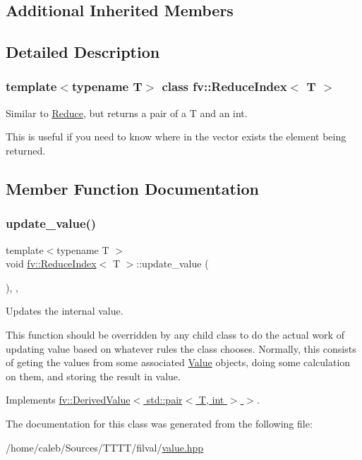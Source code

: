 \subsection*{Additional Inherited Members}


\subsection{Detailed Description}
\subsubsection*{template$<$typename T$>$\newline
class fv\+::\+Reduce\+Index$<$ T $>$}

Similar to \hyperlink{classfv_1_1Reduce}{Reduce}, but returns a pair of a T and an int. 

This is useful if you need to know where in the vector exists the element being returned. 

\subsection{Member Function Documentation}
\hypertarget{classfv_1_1ReduceIndex_a462bffebe2a93c940aca526566d48e37}{}\label{classfv_1_1ReduceIndex_a462bffebe2a93c940aca526566d48e37} 
\subsubsection{\texorpdfstring{update\+\_\+value()}{update\_value()}}
{\footnotesize\ttfamily template$<$typename T $>$ \\
void \hyperlink{classfv_1_1ReduceIndex}{fv\+::\+Reduce\+Index}$<$ T $>$\+::update\+\_\+value (\begin{DoxyParamCaption}{ }\end{DoxyParamCaption})\hspace{0.3cm}{\ttfamily [inline]}, {\ttfamily [private]}, {\ttfamily [virtual]}}



Updates the internal value. 

This function should be overridden by any child class to do the actual work of updating value based on whatever rules the class chooses. Normally, this consists of geting the values from some associated \hyperlink{classfv_1_1Value}{Value} objects, doing some calculation on them, and storing the result in value. 

Implements \hyperlink{classfv_1_1DerivedValue_ae59e80a98eb74b95d8961bfe12ee5ec2}{fv\+::\+Derived\+Value$<$ std\+::pair$<$ T, int $>$ $>$}.



The documentation for this class was generated from the following file\+:\begin{DoxyCompactItemize}
\item 
/home/caleb/\+Sources/\+T\+T\+T\+T/filval/\hyperlink{value_8hpp}{value.\+hpp}\end{DoxyCompactItemize}
